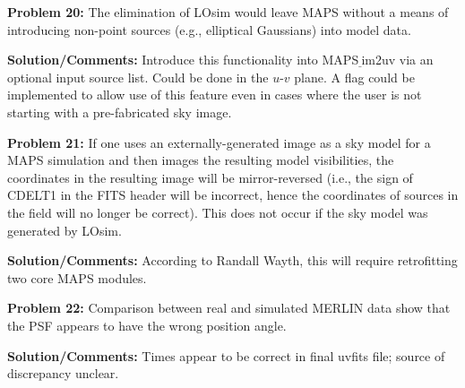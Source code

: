 \documentclass[12pt]{article}
\begin{document}
\begin{flushleft}
{\bf {\color{red}Problem 20:}} The elimination of LOsim would leave
MAPS without a means of introducing non-point sources (e.g.,
elliptical Gaussians) into model data. 

{\bf Solution/Comments:} Introduce this functionality into
MAPS$\underline~$im2uv via an optional input source list. Could be
done in the $u$-$v$ plane. A flag could be implemented to allow use of
this feature even in cases where the user is not starting with a
pre-fabricated sky image.


\bigskip

{\bf {\color{red}Problem 21:}} If one uses an
externally-generated image as a sky model for a MAPS simulation and then
images the resulting model visibilities, 
the
coordinates in the resulting image will be mirror-reversed (i.e., 
the sign of CDELT1 in the FITS header will be incorrect, 
hence the coordinates of sources in the field will no
longer be correct). This 
does not occur if the sky model was generated by LOsim.

{\bf Solution/Comments:} According to Randall Wayth, this 
will require retrofitting two core MAPS
modules.

%
%
				   
\bigskip

{\bf {\color{red}Problem 22:}} Comparison between real and simulated
MERLIN data show that the PSF appears to have the wrong position angle.

{\bf Solution/Comments:} Times appear to be correct in final uvfits
file; source of discrepancy unclear.



\end{flushleft}
\end{document}
